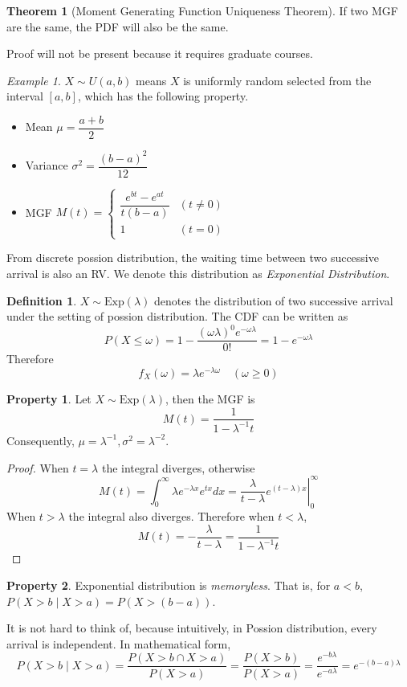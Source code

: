 \documentclass[12pt,a4paper,twoside]{article}
\theoremstyle{definition}
\newtheorem{theorem}{Theorem}[section]
\newtheorem{definition}{Definition}[section]
\newtheorem{property}{Property}[section]
\theoremstyle{remark}
\newtheorem*{example}{Example}
\begin{document}
    \begin{theorem}[Moment Generating Function Uniqueness Theorem]
        If two MGF are the same, the PDF will also be the same.
    \end{theorem}
    Proof will not be present because it requires graduate courses.

    \begin{example}
        $X \sim U(a, b)$ means $X$ is uniformly random selected from the interval $[a, b]$, which has the following property.
        \begin{itemize}
            \item Mean $\mu = \dfrac {a + b} 2$
            \item Variance $\sigma^2 = \dfrac{(b - a)^2}{12}$
            \item MGF $M(t) = \begin{cases}\dfrac{e^{bt} - e^{at}}{t(b - a)} & (t \neq 0) \\ 1 & (t = 0) \end{cases}$
        \end{itemize}
    \end{example}
    From discrete possion distribution, the waiting time between two successive arrival is also an RV. We denote this distribution as \textit{Exponential Distribution}.
    \begin{definition}
        $X \sim \text{Exp}(\lambda)$ denotes the distribution of two successive arrival under the setting of possion distribution. The CDF can be written as
        \[ P(X \leq \omega) = 1 - \frac{(\omega\lambda)^0 e^{-\omega\lambda}}{0!} = 1 - e^{-\omega\lambda}\]
        Therefore 
        \[ f_X(\omega) = \lambda e^{-\lambda\omega} \quad (\omega \geq 0)\]
    \end{definition}
    \begin{property}
        Let $X \sim \text{Exp}(\lambda)$, then the MGF is 
        \[ M(t) = \frac 1 {1 - \lambda^{-1}t} \]
        Consequently, $\mu = \lambda^{-1}, \sigma^2 = \lambda^{-2}$.
    \end{property}
    \begin{proof} When $t = \lambda$ the integral diverges, otherwise
        \[
            M(t) = \int_0^\infty \lambda e^{-\lambda x} e^{tx} dx = \left.\frac{\lambda}{t - \lambda} e^{(t-\lambda)x}\right|^\infty_0
        \]
        When $t > \lambda$ the integral also diverges. Therefore when $t < \lambda$,
        \[
            M(t) = -\frac{\lambda}{t - \lambda} = \frac 1 {1 - \lambda^{-1}t}    
        \]
    \end{proof}
    \begin{property}
        Exponential distribution is \textit{memoryless}. That is, for $a < b$, $P(X > b \mid X > a) = P(X > (b - a))$.
    \end{property}
    It is not hard to think of, because intuitively, in Possion distribution, every arrival is independent. In mathematical form,
    \[ P(X > b \mid X > a) = \frac{P(X > b \cap X > a)}{P(X > a)} =  \frac{P(X > b)}{P(X > a)} = \frac{e^{-b\lambda}}{e^{-a\lambda}} = e^{-(b-a)\lambda}\]
\end{document}
